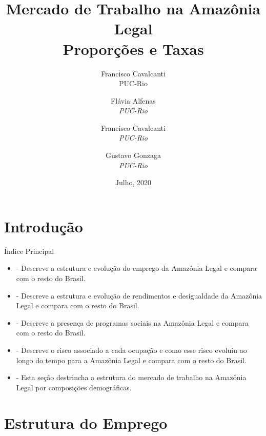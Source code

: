 \documentclass[11pt]{beamer}
\author[Francisco Cavalcanti]{Francisco Cavalcanti\\\footnotesize{PUC-Rio}
}
\author{
Flávia  Alfenas\\
\textit{PUC-Rio}\\ \vspace{3mm}
\and  
Francisco Cavalcanti\\
\textit{PUC-Rio}\\ \vspace{3mm}
\and   
Gustavo Gonzaga \\
\textit{PUC-Rio} 
}
\date{Julho, 2020}
\title{Mercado de Trabalho na Amazônia Legal \\ Proporções e Taxas}
\begin{document}

\begin{frame}
\titlepage
\end{frame}


\section{Introdução}

\begin{frame}[label=indice_principal]{Índice Principal}

\begin{itemize}
\item{
	\hyperlink{_estrutura_emprego}{} - Descreve a estrutura e evolução do emprego da Amazônia Legal e compara com o resto do Brasil.
	}   
		
\item{
	\hyperlink{_estrutura_renda}{} - Descreve a estrutura e evolução de rendimentos e desigualdade da Amazônia Legal e compara com o resto do Brasil.
	}  
	
\item{
	\hyperlink{_programas_sociais}{} - Descreve a presença de programas sociais na Amazônia Legal e compara com o resto do Brasil.
	}  
	
\item{
	\hyperlink{_transicao_ocupacao}{} - Descreve o risco associado a cada ocupação e como esse risco evoluiu ao longo do tempo para a Amazônia Legal e compara com o resto do Brasil.
	}  
	
\item{
	\hyperlink{_composicao_demografica}{} - Esta seção destrincha a estrutura do mercado de trabalho na Amazônia Legal por composições demográficas.
	}  

\end{itemize}

\end{frame}

\section{Estrutura do Emprego}
\end{document}
